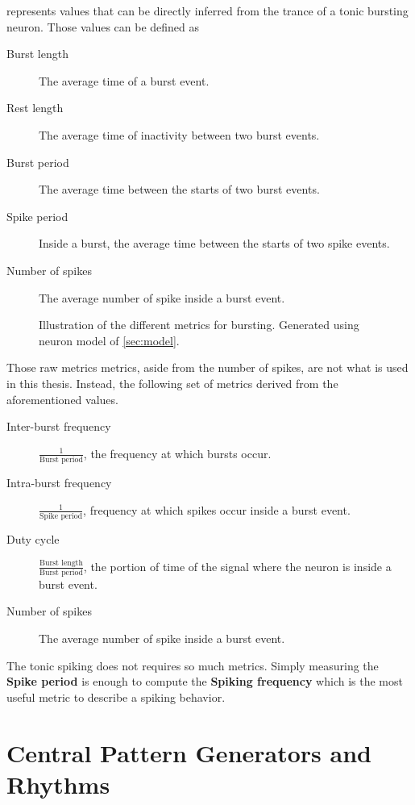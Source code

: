  represents values that can be directly inferred from the trance of a tonic bursting neuron. Those values can be defined as
\begin{description}
    \item[Burst length] The average time of a burst event.
    \item[Rest length] The average time of inactivity between two burst events.
    \item[Burst period] The average time between the starts of two burst events.
    \item[Spike period] Inside a burst, the average time between the starts of two spike events.
    \item[Number of spikes] The average number of spike inside a burst event.
\end{description}

\begin{figure}[htb]
    \centering
    \caption{Illustration of the different metrics for bursting. Generated using neuron model of \cref{sec:model}.}
    \label{fig:burst_metrics}
\end{figure}

Those raw metrics metrics, aside from the number of spikes, are not what is used in this thesis. Instead, the following set of metrics derived from the aforementioned values.
\begin{description}
    \item[Inter-burst frequency ] $\frac{1}{\text{Burst period}}$, the frequency at which bursts occur.
    \item[Intra-burst frequency] $\frac{1}{\text{Spike period}}$, frequency at which spikes occur inside a burst event.
    \item[Duty cycle] $\frac{\text{Burst length}}{\text{Burst period}}$, the portion of time of the signal where the neuron is inside a burst event.
    \item[Number of spikes] The average number of spike inside a burst event.
\end{description}

The tonic spiking does not requires so much metrics. Simply measuring the \textbf{Spike period} is enough to compute the \textbf{Spiking frequency} which is the most useful metric to describe a spiking behavior. 

\section{Central Pattern Generators and Rhythms}

